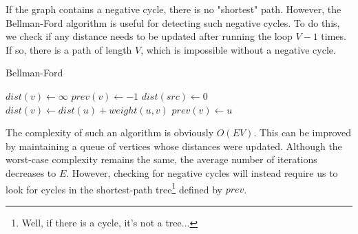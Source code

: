 \documentclass{article}
\begin{document}
If the graph contains a negative cycle, there is no "shortest" path. However, the Bellman-Ford algorithm is useful for detecting such negative cycles. To do this, we check if any distance needs to be updated after running the loop $V-1$ times. If so, there is a path of length $V$, which is impossible without a negative cycle.

\begin{algorithm}[H]
\caption{Bellman-Ford}
\begin{algorithmic}
	\State $dist(v) \gets \infty$
    \State $prev(v) \gets -1$
\EndFor
\State $dist(src) \gets 0$
    	    \State $dist(v) \gets dist(u)+weight(u,v)$
	        \State $prev(v) \gets u$
        \EndIf
	\EndFor
\EndFor
{}
	\EndIf
\EndFor
\end{algorithmic}
\end{algorithm}

The complexity of such an algorithm is obviously $O(E V)$. This can be improved by maintaining a queue of vertices whose distances were updated. Although the worst-case complexity remains the same, the average number of iterations decreases to $E$. However, checking for negative cycles will instead require us to look for cycles in the shortest-path tree\footnote{Well, if there is a cycle, it's not a tree...} defined by $prev$.
\end{document}
